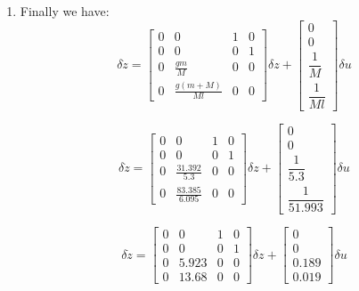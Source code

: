\documentclass[12pt,letterpaper]{article}
\begin{document}
\begin{enumerate}
    \item Finally we have:
    \begin{equation*}
        \delta \dot z =     
        \begin{bmatrix}
            0 & 0                   & 1 & 0\\ 
            0 & 0                   & 0 & 1\\ 
            0 & \frac{gm}{M}        & 0 & 0\\[10pt] 
            0 & \frac{g(m+M)}{Ml}   & 0 & 0
        \end{bmatrix}
        \delta z
        +
        \begin{bmatrix}
            0\\ 
            0\\ 
            \dfrac{1}{M}\\[10pt] 
            \dfrac{1}{Ml}
        \end{bmatrix}
        \delta u
    \end{equation*}
    
    \begin{equation*}
        \delta \dot z =     
        \begin{bmatrix}
            0 & 0                   & 1 & 0\\ 
            0 & 0                   & 0 & 1\\ 
            0 & \frac{31.392}{5.3}  & 0 & 0\\[10pt] 
            0 & \frac{83.385}{6.095}& 0 & 0
        \end{bmatrix}
        \delta z
        +
        \begin{bmatrix}
            0\\ 
            0\\ 
            \dfrac{1}{5.3}\\[10pt] 
            \dfrac{1}{51.993}
        \end{bmatrix}
        \delta u
    \end{equation*}
    
    \begin{equation*}
        \delta \dot z =     
        \begin{bmatrix}
            0 & 0       & 1 & 0\\ 
            0 & 0       & 0 & 1\\ 
            0 & 5.923   & 0 & 0\\ 
            0 & 13.68   & 0 & 0
        \end{bmatrix}
        \delta z
        +
        \begin{bmatrix}
            0\\ 
            0\\ 
            0.189\\
            0.019
        \end{bmatrix}
        \delta u
    \end{equation*}
    \end{enumerate}
\end{document}
